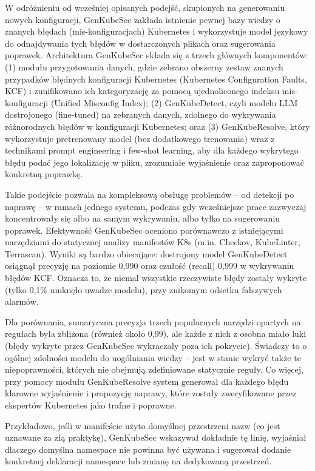W odróżnieniu od wcześniej opisanych podejść, skupionych na generowaniu nowych konfiguracji, GenKubeSec zakłada istnienie pewnej bazy wiedzy o znanych błędach (mis-konfiguracjach) Kubernetes i wykorzystuje model językowy do odnajdywania tych błędów w dostarczonych plikach oraz sugerowania poprawek. Architektura GenKubeSec składa się z trzech głównych komponentów: (1) modułu przygotowania danych, gdzie zebrano obszerny zestaw znanych przypadków błędnych konfiguracji Kubernetes (Kubernetes Configuration Faults, KCF) i zunifikowano ich kategoryzację za pomocą ujednoliconego indeksu mis-konfiguracji (Unified Misconfig Index); (2) GenKubeDetect, czyli modelu LLM dostrojonego (fine-tuned) na zebranych danych, zdolnego do wykrywania różnorodnych błędów w konfiguracji Kubernetes; oraz (3) GenKubeResolve, który wykorzystuje pretrenowany model (bez dodatkowego trenowania) wraz z technikami prompt engineering i few-shot learning, aby dla każdego wykrytego błędu podać jego lokalizację w pliku, zrozumiałe wyjaśnienie oraz zaproponować konkretną poprawkę.

Takie podejście pozwala na kompleksową obsługę problemów – od detekcji po naprawę – w ramach jednego systemu, podczas gdy wcześniejsze prace zazwyczaj koncentrowały się albo na samym wykrywaniu, albo tylko na sugerowaniu poprawek. Efektywność GenKubeSec oceniono porównawczo z istniejącymi narzędziami do statycznej analizy manifestów K8s (m.in. Checkov, KubeLinter, Terrascan). Wyniki są bardzo obiecujące: dostrojony model GenKubeDetect osiągnął precyzję na poziomie 0,990 oraz czułość (recall) 0,999 w wykrywaniu błędów KCF. Oznacza to, że niemal wszystkie rzeczywiste błędy zostały wykryte (tylko 0,1\% umknęło uwadze modelu), przy znikomym odsetku fałszywych alarmów.

Dla porównania, sumaryczna precyzja trzech popularnych narzędzi opartych na regułach była zbliżona (również około 0,99), ale każde z nich z osobna miało luki (błędy wykryte przez GenKubeSec wykraczały poza ich pokrycie). Świadczy to o ogólnej zdolności modelu do uogólniania wiedzy – jest w stanie wykryć także te niepoprawności, których nie obejmują zdefiniowane statycznie reguły. Co więcej, przy pomocy modułu GenKubeResolve system generował dla każdego błędu klarowne wyjaśnienie i propozycję naprawy, które zostały zweryfikowane przez ekspertów Kubernetes jako trafne i poprawne.

Przykładowo, jeśli w manifeście użyto domyślnej przestrzeni nazw (co jest uznawane za złą praktykę), GenKubeSec wskazywał dokładnie tę linię, wyjaśniał dlaczego domyślna namespace nie powinna być używana i sugerował dodanie konkretnej deklaracji namespace lub zmianę na dedykowaną przestrzeń.

